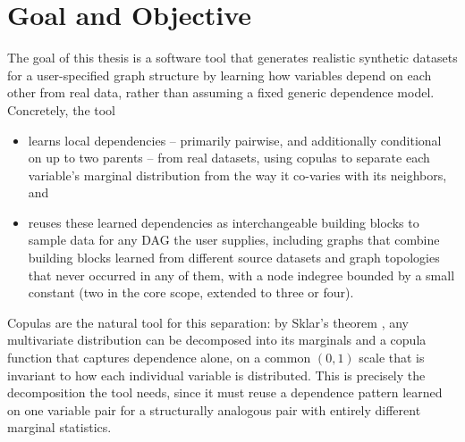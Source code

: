 \documentclass[
  english,
  class=report,
  accentcolor=2c,
  marginpar=false,
  parskip=half-,
  fontsize=11pt,
  ruledheaders=false,
  pdfa=false,
  IMRAD=false,
  thesis={type=master}
]{tudapub}
\begin{document}
\section{Goal and Objective}
The goal of this thesis is a software tool that generates realistic
synthetic datasets for a user-specified graph structure by learning how
variables depend on each other from real data, rather than assuming a fixed
generic dependence model. Concretely, the tool
\begin{itemize}
  \item learns local dependencies -- primarily pairwise, and additionally
    conditional on up to two parents -- from real datasets, using copulas to
    separate each variable's marginal distribution from the way it co-varies
    with its neighbors, and
  \item reuses these learned dependencies as interchangeable building blocks
    to sample data for any DAG the user supplies, including graphs that
    combine building blocks learned from different source datasets and graph
    topologies that never occurred in any of them, with a node indegree
    bounded by a small constant (two in the core scope, extended to three or
    four).
\end{itemize}
Copulas are the natural tool for this separation: by Sklar's theorem
\parencite{sklar1959}, any multivariate distribution can be decomposed into
its marginals and a copula function that captures dependence alone, on a
common $(0,1)$ scale that is invariant to how each individual variable is
distributed. This is precisely the decomposition the tool needs, since it
must reuse a dependence pattern learned on one variable pair for a
structurally analogous pair with entirely different marginal statistics.
\end{document}

